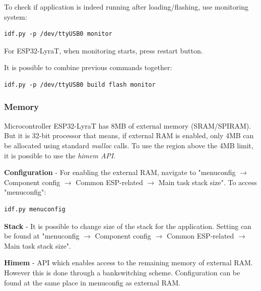 \documentclass[thesis=M,english]{FITthesis}[2019/12/23]
\begin{document}
\bigskip
\noindent
To check if application is indeed running after loading/flashing, use monitoring system:
\begin{lstlisting}[frame=single]
idf.py -p /dev/ttyUSB0 monitor
\end{lstlisting}
For ESP32-LyraT, when monitoring starts, press restart button.

\bigskip
\noindent
It is possible to combine previous commands together:
\begin{lstlisting}[frame=single]
idf.py -p /dev/ttyUSB0 build flash monitor
\end{lstlisting}

\subsubsection{Memory} \label{esp-memory}
Microcontroller ESP32-LyraT has 8MB of external memory (SRAM/SPIRAM). But it is 32-bit processor that means, if external RAM is enabled, only 4MB can be allocated using standard \textit{malloc} calls. To use the region above the 4MB limit, it is possible to use the \textit{himem API}.

\bigskip
\noindent
\textbf{Configuration} - For enabling the external RAM, navigate to "menuconfig $\rightarrow$ Component config $\rightarrow$ Common ESP-related $\rightarrow$ Main task stack size". To access "menuconfig":
\begin{lstlisting}[frame=single]
idf.py menuconfig
\end{lstlisting}

\bigskip
\noindent
\textbf{Stack} - It is possible to change size of the stack for the application. Setting can be found at "menuconfig $\rightarrow$ Component config $\rightarrow$ Common ESP-related $\rightarrow$ Main task stack size".

\bigskip
\noindent
\textbf{Himem} - API which enables access to the remaining memory of external RAM. However this is done through a bankswitching scheme. Configuration can be found at the same place in menuconfig as external RAM.

\end{document}
